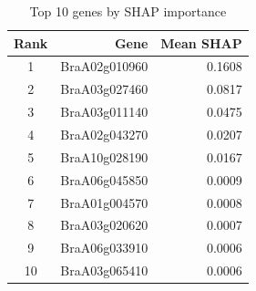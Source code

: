 \begin{table}[htbp]
\centering
\caption{Top 10 genes by SHAP importance}
\label{tab:shap_top10}
\begin{tabular}{crr}
\toprule
Rank & Gene & Mean SHAP \\
\midrule
    1 & BraA02g010960 & 0.1608 \\
    2 & BraA03g027460 & 0.0817 \\
    3 & BraA03g011140 & 0.0475 \\
    4 & BraA02g043270 & 0.0207 \\
    5 & BraA10g028190 & 0.0167 \\
    6 & BraA06g045850 & 0.0009 \\
    7 & BraA01g004570 & 0.0008 \\
    8 & BraA03g020620 & 0.0007 \\
    9 & BraA06g033910 & 0.0006 \\
    10 & BraA03g065410 & 0.0006 \\
\bottomrule
\end{tabular}
\end{table}